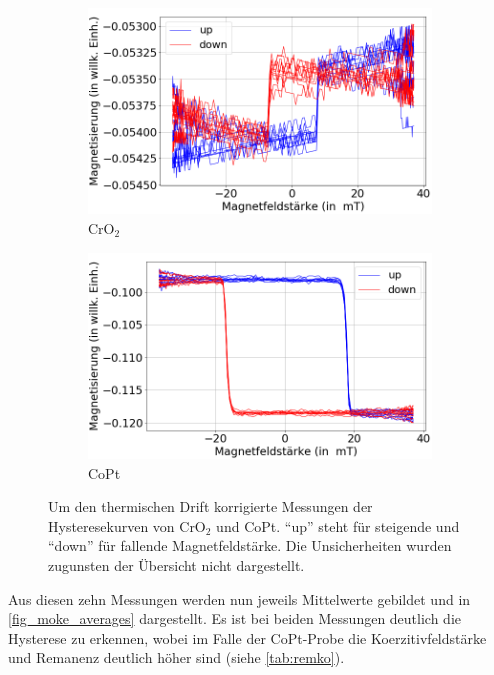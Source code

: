 \begin{figure}[H]
    \centering
    \begin{subfigure}{0.495\textwidth}
        \centering
        \includegraphics[width=1.1\textwidth]{plots/swp_all_magn_cro}
    \caption{CrO$_2$}
    \end{subfigure}
    \begin{subfigure}{0.495\textwidth}
        \centering
        \includegraphics[width=1.1\textwidth]{plots/swp_all_magn_copt}
        \caption{CoPt}
    \end{subfigure}
    \caption{Um den thermischen Drift korrigierte Messungen der Hysteresekurven von CrO$_2$ und CoPt. \enquote{up} steht für steigende und \enquote{down} für fallende Magnetfeldstärke. Die Unsicherheiten wurden zugunsten der Übersicht nicht dargestellt.}
    \label{fig_moke_einzeln}
\end{figure}

Aus diesen zehn Messungen werden nun jeweils Mittelwerte gebildet und in \cref{fig_moke_averages} dargestellt.
Es ist bei beiden Messungen deutlich die Hysterese zu erkennen, wobei im Falle der CoPt-Probe die Koerzitivfeldstärke und Remanenz deutlich höher sind (siehe \cref{tab:remko}).

